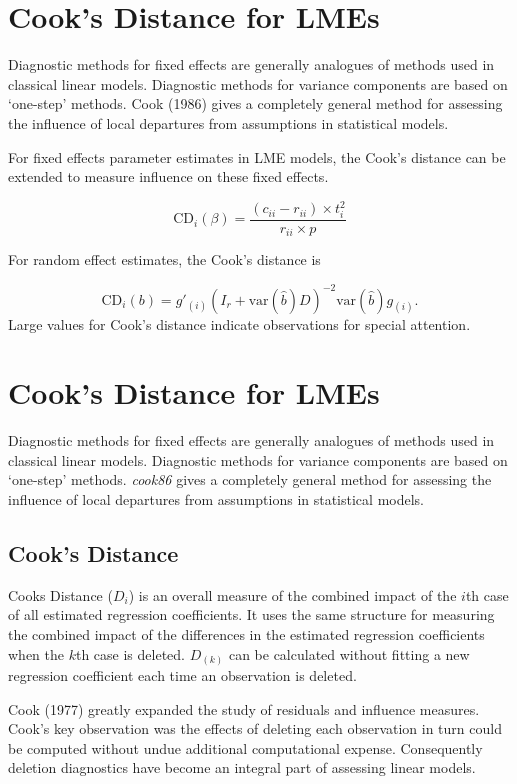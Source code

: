 \documentclass[Main.tex]{subfiles}
\begin{document}
	\section{Cook's Distance for LMEs} %
	Diagnostic methods for fixed effects are generally analogues of methods used in classical linear models.
	Diagnostic methods for variance components are based on `one-step' methods. Cook (1986) gives a completely general method for assessing the influence of local departures from assumptions in statistical models.
	
	For fixed effects parameter estimates in LME models, the  Cook's distance can be extended to measure influence on these fixed effects.
	
	\[
	\mbox{CD}_{i}(\beta) = \frac{(c_{ii} - r_{ii}) \times t^2_{i}}{r_{ii} \times p}
	\]
	
	For random effect estimates, the  Cook's distance is
	
	\[
	\mbox{CD}_{i}(b) = g{\prime}_{(i)} (I_{r} + \mbox{var}(\hat{b})D)^{-2}\mbox{var}(\hat{b})g_{(i)}.
	\]
	Large values for Cook's distance indicate observations for special attention.
	
	\section{Cook's Distance for LMEs} %
	Diagnostic methods for fixed effects are generally analogues of methods used in classical linear models.
	Diagnostic methods for variance components are based on `one-step' methods. \emph{cook86} gives a completely general method for assessing the influence of local departures from assumptions in statistical models.
	
	
	
	\subsection{Cook's Distance}%
	Cooks Distance ($D_{i}$) is an overall measure of the combined impact of the $i$th case of all estimated regression coefficients. It uses the same structure for measuring the combined impact of the differences in the estimated regression coefficients when the $k$th case is deleted. $D_{(k)}$ can be calculated without fitting
	a new regression coefficient each time an observation is deleted.
	
	
	
	
	Cook (1977) greatly expanded the study of residuals and influence measures. Cook's key observation was the effects of deleting each observation in turn could be computed without undue additional computational expense. Consequently deletion diagnostics have become an integral part of assessing linear models.
	
\end{document}
